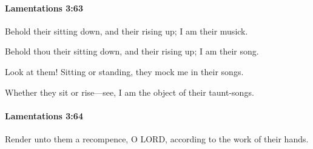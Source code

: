 		\paragraph{Lamentations 3:63} %
			\label{LAMENTATIONS-3-63}

			Behold their sitting down, and their rising up; I am their musick.

			\begin{versebox}
					\item[BHS] 
					\item[LXX] 
					\item[ASV] Behold thou their sitting down, and their rising up; I am their song.
					\item[NIV] Look at them! Sitting or standing, they mock me in their songs.
					\item[NRSV] Whether they sit or rise—see, I am the object of their taunt-songs.
			\end{versebox}

		\paragraph{Lamentations 3:64} %
			\label{LAMENTATIONS-3-64}

			Render unto them a recompence, O LORD, according to the work of their hands.

